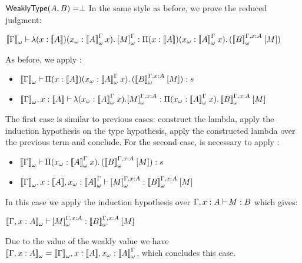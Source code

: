 \begin{Proof}
\begin{ProofCase}{\CicAbs}
\begin{SubProofCase}{$\weaklypropFun[A,B] = \False$}
In the same style as before, we prove the reduced judgment:
\begin{center}
$\ctyping[][\WContextTrans{\Context}]{\abs{x}{\TypeTrans{A}}{
                                          \WTermTrans{x}}{\app{\WParamTypeTrans{A}}{x}}{
                                          \WParamTrans{M}}}{
        \depArrow{x}{\TypeTrans{A}}{\WTermTrans{x}}{\app{\WParamTypeTrans{A}}{x}}{(
                    \app{\WParamTypeTrans[\Context,\typing{x}{A}]{B}}{\Trans{M}})}}$
\end{center}
As before, we apply \CicAbs{}:
\begin{itemize}
\item $\ctyping[][\WContextTrans{\Context}]{
               \depArrow{x}{\TypeTrans{A}}{\WTermTrans{x}}{\app{\WParamTypeTrans{A}}{x}}{(
                    \app{\WParamTypeTrans[\Context,\typing{x}{A}]{B}}{\Trans{M}})}}{
                s}$
\item $\ctyping[][\WContextTrans{\Context},\typing{x}{\TypeTrans{A}}]{
                  \varabs{\WTermTrans{x}}{\app{\WParamTypeTrans{A}}{x}}{
                            \WParamTrans[\Context,\typing{x}{A}]{M}}}{
                \enDepArrow{\WTermTrans{x}}{\app{\WParamTypeTrans{A}}{x}}{
                            \app{\WParamTypeTrans[\Context,\typing{x}{A}]{B}}{\Trans{M}}}}$
\end{itemize}
The first case is similar to previous cases: construct the lambda, apply the induction hypothesis
on the type hypothesis, apply the constructed lambda over the previous term and conclude. 
For the second case, is necessary to apply \CicAbs{}:
\begin{itemize}
\item $\ctyping[][\WContextTrans{\Context}]{
               \enDepArrow{\WTermTrans{x}}{\app{\WParamTypeTrans{A}}{x}}{(
                    \app{\WParamTypeTrans[\Context,\typing{x}{A}]{B}}{\Trans{M}})}}{
                s}$
\item $\ctyping[][\WContextTrans{\Context},
                  \typing{x}{\TypeTrans{A}},\typing{\WTermTrans{x}}{\WParamTypeTrans{A}}]{
                \WParamTrans[\Context,\typing{x}{A}]{M}}{
                \app{\WParamTypeTrans[\Context,\typing{x}{A}]{B}}{\Trans{M}}}$
\end{itemize}
In this case we apply the induction hypothesis over $\ctyping[\typing{x}{A}]{M}{B}$ which gives:
\begin{center}
$\ctyping[][\WContextTrans{\Context,\typing{x}{A}}]{
                \WParamTrans[\Context,\typing{x}{A}]{M}}{
                \app{\WParamTypeTrans[\Context,\typing{x}{A}]{B}}{\Trans{M}}}$
\end{center}
Due to the value of the weakly value we have 
$\WContextTrans{\Context,\typing{x}{A}}
\termEq
\WContextTrans{\Context},\typing{x}{\TypeTrans{A}},\typing{\WTermTrans{x}}{\WParamTypeTrans{A}}$,
which concludes this case.
\end{SubProofCase}
\end{ProofCase}


\end{Proof}
